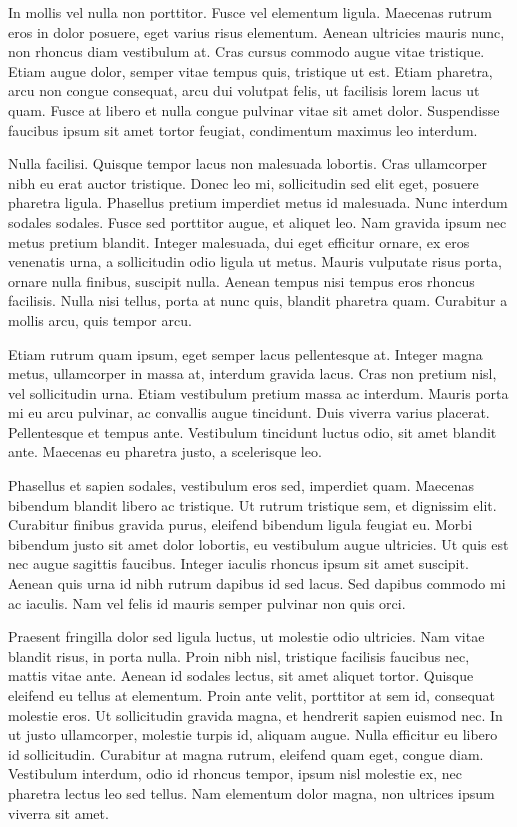 In mollis vel nulla non porttitor. Fusce vel elementum ligula. Maecenas rutrum eros in dolor posuere, eget varius risus elementum. Aenean ultricies mauris nunc, non rhoncus diam vestibulum at. Cras cursus commodo augue vitae tristique. Etiam augue dolor, semper vitae tempus quis, tristique ut est. Etiam pharetra, arcu non congue consequat, arcu dui volutpat felis, ut facilisis lorem lacus ut quam. Fusce at libero et nulla congue pulvinar vitae sit amet dolor. Suspendisse faucibus ipsum sit amet tortor feugiat, condimentum maximus leo interdum.

Nulla facilisi. Quisque tempor lacus non malesuada lobortis. Cras ullamcorper nibh eu erat auctor tristique. Donec leo mi, sollicitudin sed elit eget, posuere pharetra ligula. Phasellus pretium imperdiet metus id malesuada. Nunc interdum sodales sodales. Fusce sed porttitor augue, et aliquet leo. Nam gravida ipsum nec metus pretium blandit. Integer malesuada, dui eget efficitur ornare, ex eros venenatis urna, a sollicitudin odio ligula ut metus. Mauris vulputate risus porta, ornare nulla finibus, suscipit nulla. Aenean tempus nisi tempus eros rhoncus facilisis. Nulla nisi tellus, porta at nunc quis, blandit pharetra quam. Curabitur a mollis arcu, quis tempor arcu.

Etiam rutrum quam ipsum, eget semper lacus pellentesque at. Integer magna metus, ullamcorper in massa at, interdum gravida lacus. Cras non pretium nisl, vel sollicitudin urna. Etiam vestibulum pretium massa ac interdum. Mauris porta mi eu arcu pulvinar, ac convallis augue tincidunt. Duis viverra varius placerat. Pellentesque et tempus ante. Vestibulum tincidunt luctus odio, sit amet blandit ante. Maecenas eu pharetra justo, a scelerisque leo.

Phasellus et sapien sodales, vestibulum eros sed, imperdiet quam. Maecenas bibendum blandit libero ac tristique. Ut rutrum tristique sem, et dignissim elit. Curabitur finibus gravida purus, eleifend bibendum ligula feugiat eu. Morbi bibendum justo sit amet dolor lobortis, eu vestibulum augue ultricies. Ut quis est nec augue sagittis faucibus. Integer iaculis rhoncus ipsum sit amet suscipit. Aenean quis urna id nibh rutrum dapibus id sed lacus. Sed dapibus commodo mi ac iaculis. Nam vel felis id mauris semper pulvinar non quis orci.

Praesent fringilla dolor sed ligula luctus, ut molestie odio ultricies. Nam vitae blandit risus, in porta nulla. Proin nibh nisl, tristique facilisis faucibus nec, mattis vitae ante. Aenean id sodales lectus, sit amet aliquet tortor. Quisque eleifend eu tellus at elementum. Proin ante velit, porttitor at sem id, consequat molestie eros. Ut sollicitudin gravida magna, et hendrerit sapien euismod nec. In ut justo ullamcorper, molestie turpis id, aliquam augue. Nulla efficitur eu libero id sollicitudin. Curabitur at magna rutrum, eleifend quam eget, congue diam. Vestibulum interdum, odio id rhoncus tempor, ipsum nisl molestie ex, nec pharetra lectus leo sed tellus. Nam elementum dolor magna, non ultrices ipsum viverra sit amet.

